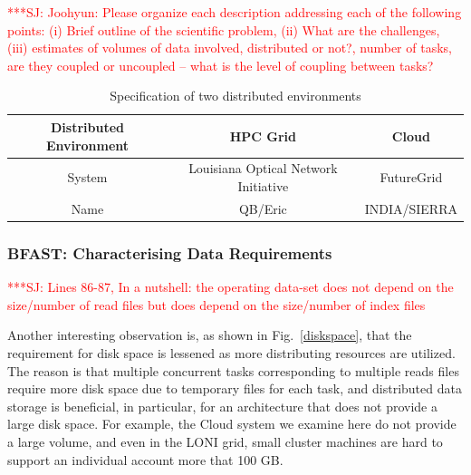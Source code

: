 \documentclass[12pt]{article}
\newcommand{\jhanote}[1]{ {\textcolor{red}     {***SJ: #1}}}
\newcommand{\jhanote}[1]{}
\begin{document}
\jhanote{Joohyun: Please organize each description addressing each of
  the following points: (i) Brief outline of the scientific problem,
  (ii) What are the challenges, (iii) estimates of volumes of data
  involved, distributed or not?, number of tasks, are they coupled or
  uncoupled -- what is the level of coupling between tasks?}


 \begin{table}
 \begin{tabular}{|c|cc|} 
 \hline 
Distributed Environment &  HPC Grid &  Cloud \\ \hline
System  &  Louisiana Optical Network Initiative & FutureGrid \\
Name &  QB/Eric   &  INDIA/SIERRA \\
 \hline
 \end{tabular}
\caption{Specification of two distributed environments}
\label{table:two-systems} 
\end{table}
 
\subsubsection{BFAST: Characterising Data Requirements}

\jhanote{Lines 86-87, In a nutshell: the operating data-set does not depend on the size/number of read files but does depend on the size/number of index files}

Another interesting observation is, as shown in Fig.~\ref{diskspace}, that the requirement for disk space is lessened as more distributing resources are utilized. The reason is that multiple concurrent tasks corresponding to multiple reads files require more disk space due to temporary files for each task, and distributed data storage is beneficial, in particular, for an architecture that does not provide a large disk space.  For example, the Cloud system we examine here do not provide a large volume, and even in the LONI grid, small cluster machines are hard to support an individual account more that 100 GB.
\end{document}
